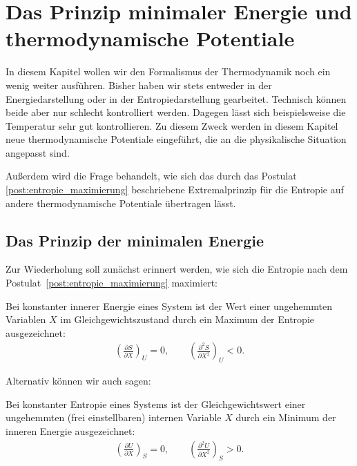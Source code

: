 

\chapter{Das Prinzip minimaler Energie und thermodynamische Potentiale}

In diesem Kapitel wollen wir den Formalismus der Thermodynamik noch ein wenig weiter ausführen.
Bisher haben wir stets entweder in der Energiedarstellung oder in der Entropiedarstellung gearbeitet. Technisch können beide aber nur schlecht kontrolliert werden. Dagegen lässt sich beispielsweise die Temperatur sehr gut kontrollieren. Zu diesem Zweck werden in diesem Kapitel neue thermodynamische Potentiale eingeführt, die an die physikalische Situation angepasst sind.

Außerdem wird die Frage behandelt, wie sich das durch das Postulat \ref{post:entropie_maximierung} beschriebene Extremalprinzip für die Entropie auf andere thermodynamische Potentiale übertragen lässt.


\section{Das Prinzip der minimalen Energie}

Zur Wiederholung soll zunächst erinnert werden, wie sich die Entropie nach dem Postulat~\ref{post:entropie_maximierung} maximiert:
\begin{formal}
    Bei konstanter innerer Energie eines System ist der Wert einer ungehemmten Variablen $X$ im Gleichgewichtszustand durch ein Maximum der Entropie ausgezeichnet:
    \begin{align*}
        \left( \frac{\partial S}{\partial X}  \right)_U = 0, \qquad \left( \frac{\partial ^2S}{\partial X^2}  \right)_U < 0.
    \end{align*}
\end{formal}




Alternativ können wir auch sagen:

\begin{formal}
    Bei konstanter Entropie eines Systems ist der Gleichgewichtswert einer ungehemmten (frei einstellbaren) internen Variable $X$ durch ein Minimum der inneren Energie ausgezeichnet:
    \begin{align*}
        \left( \frac{\partial U}{\partial X}  \right)_S = 0, \qquad \left( \frac{\partial ^2U}{\partial X^2}  \right)_S > 0.
    \end{align*}
\end{formal}